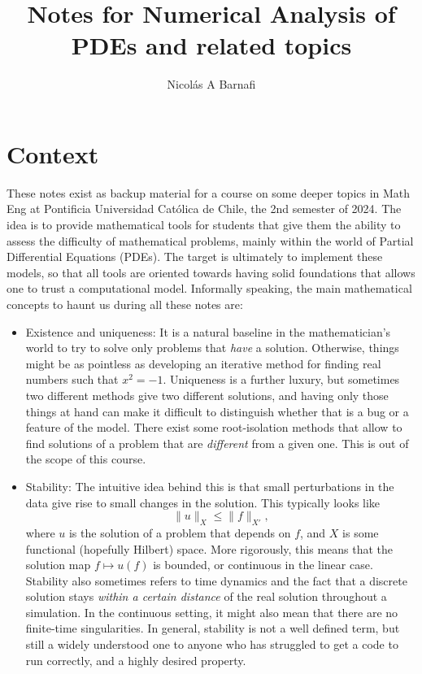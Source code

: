 \documentclass{article}
\title{Notes for Numerical Analysis of PDEs and related topics}
\author{Nicol\'as A Barnafi}
\begin{document}
\maketitle
\newpage
\tableofcontents
\newpage

\section*{Context}

These notes exist as backup material for a course on some deeper topics in Math Eng at Pontificia Universidad Católica de Chile, the 2nd semester of 2024. The idea is to provide mathematical tools for students that give them the ability to assess the difficulty of mathematical problems, mainly within the world of Partial Differential Equations (PDEs). The target is ultimately to implement these models, so that all tools are oriented towards having solid foundations that allows one to trust a computational model. Informally speaking, the main mathematical concepts to haunt us during all these notes are: 
    \begin{itemize}
        \item Existence and uniqueness: It is a natural baseline in the mathematician's world to try to solve only problems that \emph{have} a solution. Otherwise, things might be as pointless as developing an iterative method for finding real numbers such that $x^2 = -1$. Uniqueness is a further luxury, but sometimes two different methods give two different solutions, and having only those things at hand can make it difficult to distinguish whether that is a bug or a feature of the model. There exist some root-isolation methods that allow to find solutions of a problem that are \emph{different} from a given one. This is out of the scope of this course. 
        \item Stability: The intuitive idea behind this is that small perturbations in the data give rise to small changes in the solution. This typically looks like 
            $$ \| u\|_X \leq \| f\|_{X'}, $$
        where $u$ is the solution of a problem that depends on $f$, and $X$ is some functional (hopefully Hilbert) space. More rigorously, this means that the solution map $f \mapsto u(f)$ is bounded, or continuous in the linear case. Stability also sometimes refers to time dynamics and the fact that a discrete solution stays \emph{within a certain distance} of the real solution throughout a simulation. In the continuous setting, it might also mean that there are no finite-time singularities. In general, stability is not a well defined term, but still a widely understood one to anyone who has struggled to get a code to run correctly, and a highly desired property. 
    \end{itemize}
\end{document}
